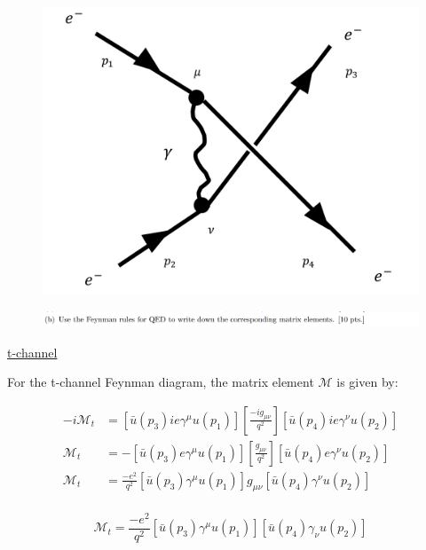 \documentclass[11pt]{article}
\theoremstyle{definition}
\numberwithin{equation}{section}
\begin{document}
\begin{figure}[H]
    \centering
    \includegraphics[scale = 0.4]{moller u-channel.png}
\end{figure}

\newpage



\begin{figure}[H]
    \centering
    \includegraphics[scale = 0.4]{2b.png}
\end{figure}

\underline{t-channel}

For the t-channel Feynman diagram, the matrix element $\mathcal{M}$ is given by:

\begin{align}
    -i\mathcal{M}_{t} &= [\bar{u}(p_3)ie\gamma^{\mu}u(p_1)] 
    \left[ \frac{-ig_{\mu\nu}}{q^2} \right]
    [\bar{u}(p_4)ie\gamma^{\nu}u(p_2)]\\
    \mathcal{M}_{t} &= -[\bar{u}(p_3)e\gamma^{\mu}u(p_1)] 
    \left[ \frac{g_{\mu\nu}}{q^2} \right]
    [\bar{u}(p_4)e\gamma^{\nu}u(p_2)]\\
    \mathcal{M}_{t} &= \frac{-e^2}{q^2} [\bar{u}(p_3)\gamma^{\mu}u(p_1)]
    g_{\mu\nu}[\bar{u}(p_4)\gamma^{\nu}u(p_2)]\\
\end{align}

\begin{equation}
\boxed{
    \mathcal{M}_{t} = \frac{-e^2}{q^2} [\bar{u}(p_3)\gamma^{\mu}u(p_1)]
    [\bar{u}(p_4)\gamma_{\nu}u(p_2)]
}
\end{equation}
\end{document}
